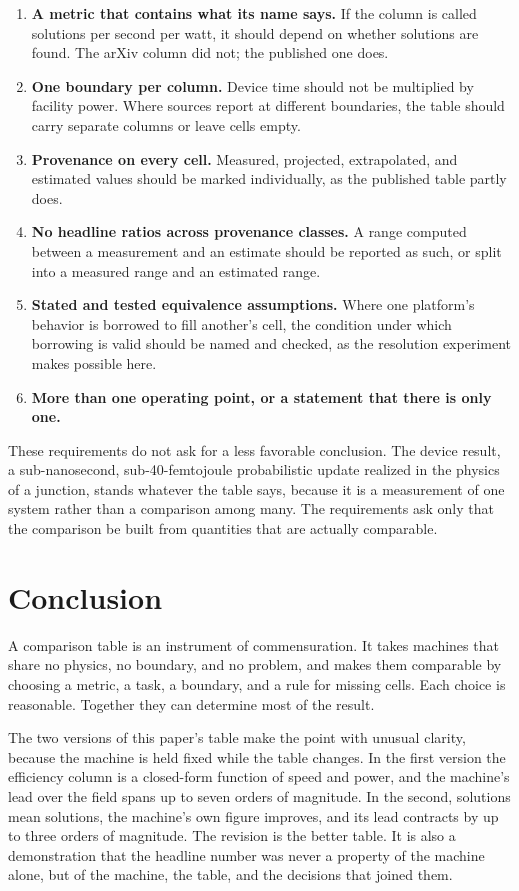 \documentclass[11pt]{article}
\theoremstyle{definition}
\theoremstyle{remark}
\begin{document}
\begin{enumerate}
\item \textbf{A metric that contains what its name says.} If the column is called solutions per second per watt, it should depend on whether solutions are found. The arXiv column did not; the published one does.
\item \textbf{One boundary per column.} Device time should not be multiplied by facility power. Where sources report at different boundaries, the table should carry separate columns or leave cells empty.
\item \textbf{Provenance on every cell.} Measured, projected, extrapolated, and estimated values should be marked individually, as the published table partly does.
\item \textbf{No headline ratios across provenance classes.} A range computed between a measurement and an estimate should be reported as such, or split into a measured range and an estimated range.
\item \textbf{Stated and tested equivalence assumptions.} Where one platform's behavior is borrowed to fill another's cell, the condition under which borrowing is valid should be named and checked, as the resolution experiment makes possible here.
\item \textbf{More than one operating point, or a statement that there is only one.}
\end{enumerate}

These requirements do not ask for a less favorable conclusion. The device result, a sub-nanosecond, sub-40-femtojoule probabilistic update realized in the physics of a junction, stands whatever the table says, because it is a measurement of one system rather than a comparison among many. The requirements ask only that the comparison be built from quantities that are actually comparable.

\section{Conclusion}

A comparison table is an instrument of commensuration. It takes machines that share no physics, no boundary, and no problem, and makes them comparable by choosing a metric, a task, a boundary, and a rule for missing cells. Each choice is reasonable. Together they can determine most of the result.

The two versions of this paper's table make the point with unusual clarity, because the machine is held fixed while the table changes. In the first version the efficiency column is a closed-form function of speed and power, and the machine's lead over the field spans up to seven orders of magnitude. In the second, solutions mean solutions, the machine's own figure improves, and its lead contracts by up to three orders of magnitude. The revision is the better table. It is also a demonstration that the headline number was never a property of the machine alone, but of the machine, the table, and the decisions that joined them.
\end{document}
